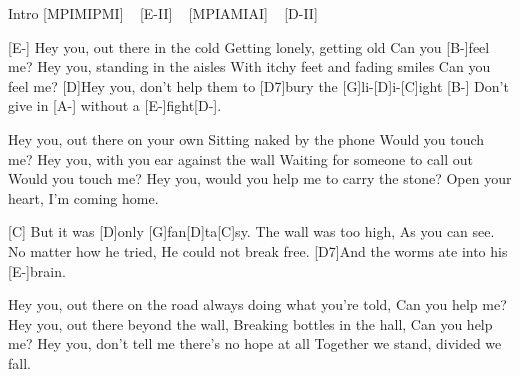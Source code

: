 \begin{guitar}
Intro
[MPIMIPMI] ~ [E-II] ~ [MPIAMIAI] ~ [D-II]

[E-]
Hey you, out there in the cold
Getting lonely, getting old
Can you [B-]feel me?
Hey you, standing in the aisles
With itchy feet and fading smiles
Can you feel me?
[D]Hey you, don’t help them to [D7]bury the [G]li-[D]i-[C]ight
[B-] Don't give in [A-] without a [E-]fight[D-].

Hey you, out there on your own
Sitting naked by the phone
Would you touch me?
Hey you, with you ear against the wall
Waiting for someone to call out
Would you touch me?
Hey you, would you help me to carry the stone?
Open your heart, I'm coming home.


[C] But it was [D]only [G]fan[D]ta[C]sy.
The wall was too high,
As you can see.
No matter how he tried,
He could not break free.
[D7]And the worms ate into his [E-]brain.

Hey you, out there on the road
always doing what you're told,
Can you help me?
Hey you, out there beyond the wall,
Breaking bottles in the hall,
Can you help me?
Hey you, don't tell me there's no hope at all
Together we stand, divided we fall.
\end{guitar}
